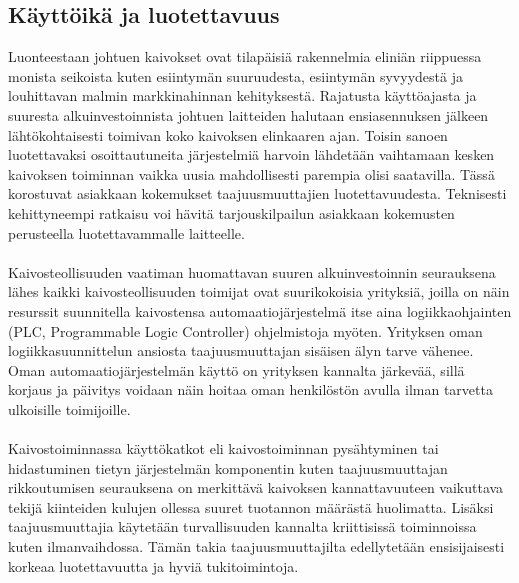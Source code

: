 \documentclass[finnish,12pt,a4paper,pdftex,elec,utf8]{aaltothesis}
\begin{document}

\subsection{Käyttöikä ja luotettavuus}
Luonteestaan johtuen kaivokset ovat tilapäisiä rakennelmia eliniän riippuessa monista seikoista kuten esiintymän suuruudesta, esiintymän syvyydestä ja louhittavan malmin markkinahinnan kehityksestä. Rajatusta käyttöajasta ja suuresta alkuinvestoinnista johtuen laitteiden halutaan ensiasennuksen jälkeen lähtökohtaisesti toimivan koko kaivoksen elinkaaren ajan. Toisin sanoen luotettavaksi osoittautuneita järjestelmiä harvoin lähdetään vaihtamaan kesken kaivoksen toiminnan vaikka uusia mahdollisesti parempia olisi saatavilla. Tässä korostuvat asiakkaan kokemukset taajuusmuuttajien luotettavuudesta. Teknisesti kehittyneempi ratkaisu voi hävitä tarjouskilpailun asiakkaan kokemusten perusteella luotettavammalle laitteelle. \cite{MyyntiHaastattelu}
\\\\
Kaivosteollisuuden vaatiman huomattavan suuren alkuinvestoinnin seurauksena lähes kaikki kaivosteollisuuden toimijat ovat suurikokoisia yrityksiä, joilla on näin resurssit suunnitella kaivostensa automaatiojärjestelmä itse aina logiikkaohjainten (PLC, Programmable Logic Controller) ohjelmistoja myöten. Yrityksen oman logiikkasuunnittelun ansiosta taajuusmuuttajan sisäisen älyn tarve vähenee. Oman automaatiojärjestelmän käyttö on yrityksen kannalta järkevää, sillä korjaus ja päivitys voidaan näin hoitaa oman henkilöstön avulla ilman tarvetta ulkoisille toimijoille. \cite{MyyntiHaastattelu}
\\\\
Kaivostoiminnassa käyttökatkot eli kaivostoiminnan pysähtyminen tai hidastuminen tietyn järjestelmän komponentin kuten taajuusmuuttajan rikkoutumisen seurauksena on merkittävä kaivoksen kannattavuuteen vaikuttava tekijä kiinteiden kulujen ollessa suuret tuotannon määrästä huolimatta. Lisäksi taajuusmuuttajia käytetään turvallisuuden kannalta kriittisissä toiminnoissa kuten ilmanvaihdossa. Tämän takia taajuusmuuttajilta edellytetään ensisijaisesti korkeaa luotettavuutta ja hyviä tukitoimintoja.\cite{MyyntiHaastattelu}


\end{document}
